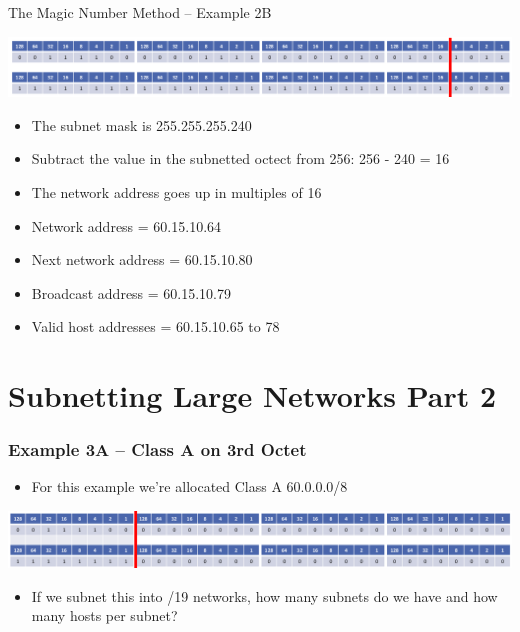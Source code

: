 \documentclass[pdflatex,compress]{beamer}
\begin{document}
\begin{frame}{The Magic Number Method – Example 2B}
	\begin{center}
		\includegraphics[width=\linewidth]{img/img21}
	\end{center}
	\begin{itemize}
		\item The subnet mask is 255.255.255.240
		\item Subtract the value in the subnetted octect from 256: 256 - 240 = 16
		\item The network address goes up in multiples of 16
		\item Network address = 60.15.10.64
		\item Next network address = 60.15.10.80
		\item Broadcast address = 60.15.10.79
		\item Valid host addresses = 60.15.10.65 to 78
	\end{itemize}
\end{frame}

\section{Subnetting Large Networks Part 2}

\begin{frame}
	\frametitle{Example 3A – Class A on 3rd Octet}
	\begin{itemize}
		\item For this example we’re allocated Class A 60.0.0.0/8
	\end{itemize}
	\begin{center}
		\includegraphics[width=\linewidth]{img/img22}
	\end{center}
	\begin{itemize}
		\item If we subnet this into /19 networks, how many subnets do we have and how many hosts per subnet?
	\end{itemize}
\end{frame}
\end{document}
